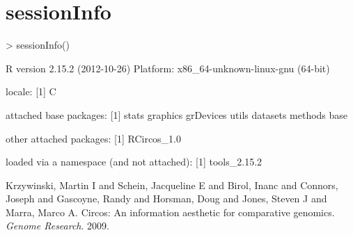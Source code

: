 \documentclass{article}
\begin{document}
\section{sessionInfo}
\begin{Schunk}
\begin{Sinput}
> sessionInfo()
\end{Sinput}
\begin{Soutput}
R version 2.15.2 (2012-10-26)
Platform: x86_64-unknown-linux-gnu (64-bit)

locale:
[1] C

attached base packages:
[1] stats     graphics  grDevices utils     datasets  methods   base     

other attached packages:
[1] RCircos_1.0

loaded via a namespace (and not attached):
[1] tools_2.15.2
\end{Soutput}
\end{Schunk}

\begin{thebibliography}{1}
  Krzywinski, Martin I and Schein, Jacqueline E and Birol, Inanc and Connors, Joseph and Gascoyne, Randy and Horsman, Doug and Jones, Steven J and Marra, Marco A.  Circos: An information aesthetic for comparative genomics. \textit{Genome Research}. 2009.
\end{thebibliography}
\end{document}
